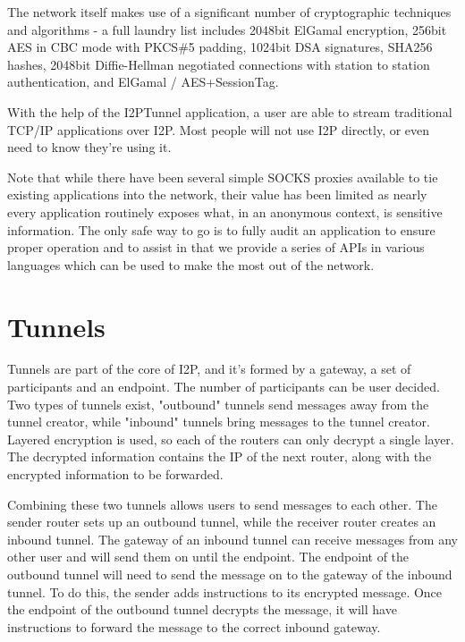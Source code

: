 \documentclass[a4paper,twocolumn,12pt]{article}
\begin{document}
The network itself makes use of a significant number of cryptographic techniques and algorithms - a full laundry list includes 2048bit ElGamal encryption, 256bit AES in CBC mode with PKCS\#5 padding, 1024bit DSA signatures, SHA256 hashes, 2048bit Diffie-Hellman negotiated connections with station to station authentication, and ElGamal / AES+SessionTag.

\vspace{2 em}

With the help of the I2PTunnel application, a user are able to stream traditional TCP/IP applications over I2P. Most people will not use I2P directly, or even need to know they're using it.

Note that while there have been several simple SOCKS proxies available to tie existing applications into the network, their value has been limited as nearly every application routinely exposes what, in an anonymous context, is sensitive information. The only safe way to go is to fully audit an application to ensure proper operation and to assist in that we provide a series of APIs in various languages which can be used to make the most out of the network.

\section{Tunnels}

Tunnels are part of the core of I2P, and it's formed by a gateway, a set of participants and an endpoint. The number of participants can be user decided. Two types of tunnels exist, "outbound" tunnels send messages away from the tunnel creator, while "inbound" tunnels bring messages to the tunnel creator. Layered encryption is used, so each of the routers can only decrypt a single layer. The decrypted information contains the IP of the next router, along with the encrypted information to be forwarded.

Combining these two tunnels allows users to send messages to each other. The sender router sets up an outbound tunnel, while the receiver router creates an inbound tunnel. The gateway of an inbound tunnel can receive messages from any other user and will send them on until the endpoint. The endpoint of the outbound tunnel will need to send the message on to the gateway of the inbound tunnel. To do this, the sender adds instructions to its encrypted message. Once the endpoint of the outbound tunnel decrypts the message, it will have instructions to forward the message to the correct inbound gateway.
\end{document}
